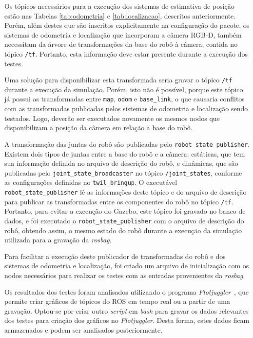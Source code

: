 \documentclass[repeatfields,xlists,xpacks,oneside,yearsonly]{ufrgscca}
\begin{document}
Os tópicos necessários para a execução dos sistemas de estimativa de
posição estão nas Tabelas \ref{tab:odometria} e
\ref{tab:localizacao}, descritos anteriormente. Porém, além destes
que são inscritos explicitamente na configuração do pacote, os
sistemas de odometria e localização que incorporam a câmera RGB-D,
também necessitam da árvore de transformações da base do robô à
câmera, contida no tópico \texttt{/tf}. Portanto, esta informação
deve estar presente durante a execução dos testes.

Uma solução para disponibilizar esta transformada seria gravar o
tópico \texttt{/tf} durante a execução da simulação. Porém, isto não
é possível, porque este tópico já possui as transformadas entre
\texttt{map}, \texttt{odom} e \texttt{base\_link}, o que causaria
conflitos com as transformadas publicadas pelos sistemas de odometria
e localização sendo testados. Logo, deverão ser executados novamente
os mesmos nodos que disponibilizam a posição da câmera em relação a
base do robô.

A transformação das juntas do robô são publicadas pelo
\texttt{robot\_state\_publisher}. Existem dois tipos de juntas entre
a base do robô e a câmera: estáticas, que tem sua informação definida
no arquivo de descrição do robô, e dinâmicas, que são publicadas pelo
\texttt{joint\_state\_broadcaster} no tópico \texttt{/joint\_states},
conforme as configurações definidas no \texttt{twil\_bringup}. O
executável \texttt{robot\_state\_publisher} lê as informações deste
tópico e do arquivo de descrição para publicar as transformadas entre
os componentes do robô no tópico \texttt{/tf}. Portanto, para evitar
a execução do Gazebo, este tópico foi gravado no banco de dados, e
foi executado o \texttt{robot\_state\_publisher} com o arquivo de
descrição do robô, obtendo assim, o mesmo estado do robô durante a
execução da simulação utilizada para a gravação da \textit{rosbag}.

Para facilitar a execução deste publicador de transformadas do robô e
dos sistemas de odometria e localização, foi criado um arquivo de
inicialização com os nodos necessários para realizar os testes com as
entradas provenientes da \textit{rosbag}.

Os resultados dos testes foram analisados utilizando o programa
\textit{Plotjuggler}~\cite{plotjuggler}, que permite criar gráficos
de tópicos do ROS em tempo real ou a partir de uma gravação. Optou-se
por criar outro \textit{script} em \textit{bash} para gravar os dados
relevantes dos testes para criação dos gráficos no
\textit{Plotjuggler}. Desta forma, estes dados ficam armazenados e
podem ser analisados posteriormente.
\end{document}
